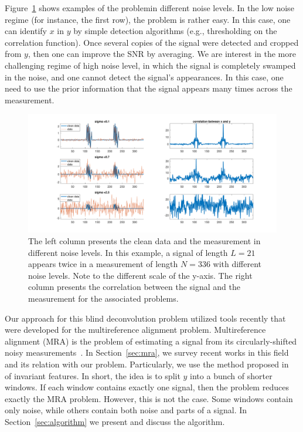 \documentclass[journal]{IEEEtran}
\numberwithin{equation}{section}
\numberwithin{figure}{section}
\theoremstyle{plain}
\theoremstyle{definition}
\theoremstyle{remark}
\theoremstyle{plain}
\theoremstyle{remark}
\theoremstyle{plain}
\theoremstyle{plain}
\begin{document}
Figure~\ref{fig:example} shows examples of the problemin different noise levels. In the low noise regime (for instance, the first row), the problem is rather easy. In this case, one can identify $x$ in $y$ by simple detection algorithms (e.g., thresholding on the correlation function). Once several copies of the signal were detected and cropped from $y$, then one can  improve the SNR by averaging. We are interest in the more challenging regime of high noise level, in which the signal is completely swamped in the noise, and one cannot detect the signal's appearances. In this case, one need to use the prior information that the signal appears many times across the measurement.

\begin{figure}
	\begin{center}
	\includegraphics[scale = .5]{example}
	\end{center}
\caption{The left column presents the clean data and the measurement in different noise levels. In this example, a signal of length $L=21$ appears twice in a measurement of length $N=336$ with different noise levels. Note to the different scale of the y-axis. The right column presents the correlation between the signal and the measurement for the associated problems. }
\label{fig:example}
\end{figure}

Our approach for this blind deconvolution problem utilized  tools recently that were developed for the multireference alignment problem. Multireference alignment (MRA) is the problem of estimating a signal from its circularly-shifted noisy measurements~\cite{bandeira2014multireference,bendory2017bispectrum}. In Section~\ref{sec:mra}, we survey recent works in this field and its relation with our problem. Particularly, we use the method proposed in~\cite{bendory2017bispectrum} of invariant features. In short, the idea is to split $y$ into a bunch of shorter windows. If each window contains exactly  one signal, then the problem reduces exactly the MRA problem. However, this is not the case. Some windows contain only noise, while others contain both noise and parts of a signal. In Section~\ref{sec:algorithm} we present and discuss the algorithm. 
\end{document}
